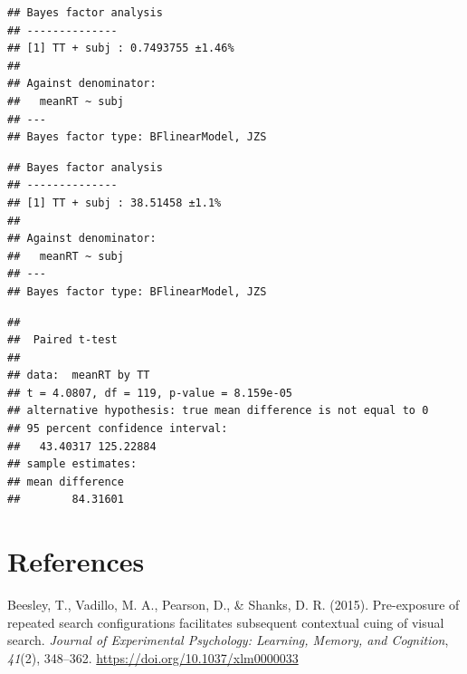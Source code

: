 \documentclass[
  man]{apa7}
\newlength{\cslhangindent}
\newlength{\cslentryspacingunit} %
\newenvironment{CSLReferences}[2] %
 {%
  \setlength{\parindent}{0pt}
  \ifodd #1
  \let\oldpar\par
  \def\par{\hangindent=\cslhangindent\oldpar}
  \fi
  \setlength{\parskip}{#2\cslentryspacingunit}
 }%
 {}
\begin{document}
\begin{verbatim}
## Bayes factor analysis
## --------------
## [1] TT + subj : 0.7493755 ±1.46%
## 
## Against denominator:
##   meanRT ~ subj 
## ---
## Bayes factor type: BFlinearModel, JZS
\end{verbatim}

\begin{verbatim}
## Bayes factor analysis
## --------------
## [1] TT + subj : 38.51458 ±1.1%
## 
## Against denominator:
##   meanRT ~ subj 
## ---
## Bayes factor type: BFlinearModel, JZS
\end{verbatim}

\begin{verbatim}
## 
##  Paired t-test
## 
## data:  meanRT by TT
## t = 4.0807, df = 119, p-value = 8.159e-05
## alternative hypothesis: true mean difference is not equal to 0
## 95 percent confidence interval:
##   43.40317 125.22884
## sample estimates:
## mean difference 
##        84.31601
\end{verbatim}

\newpage

\hypertarget{references}{%
\section*{References}\label{references}}

\hypertarget{refs}{}
\begin{CSLReferences}{1}{0}
\leavevmode{}%
Beesley, T., Vadillo, M. A., Pearson, D., \& Shanks, D. R. (2015). Pre-exposure of repeated search configurations facilitates subsequent contextual cuing of visual search. \emph{Journal of Experimental Psychology: Learning, Memory, and Cognition}, \emph{41}(2), 348--362. \url{https://doi.org/10.1037/xlm0000033}

\end{CSLReferences}
\end{document}
